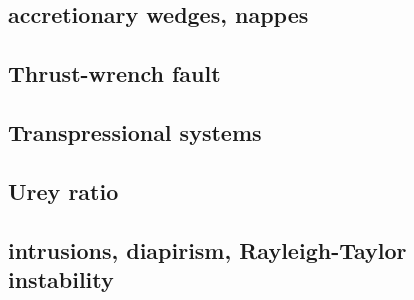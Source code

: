 \noindent
\cite{lejm08}
\cite{ligt09}\cite{gogk09}
\cite{ligt11}
\cite{gobg14}\cite{yadl14}
\cite{neum19}

\subsection*{accretionary wedges, nappes} 

\noindent
\cite{stoc83}\cite{dasd83}
\cite{dahl84}\cite{dasd84}
\cite{dahl90}
\cite{koon94}
\cite{wiep03}
\cite{rugb14}
\cite{mauw16}
\cite{mauw17}\cite{rugb17}
\cite{elgb19}

\subsection*{Thrust-wrench fault} 

\noindent
\cite{rods15}

\subsection*{Transpressional systems} 

\noindent
\cite{tite94}
\cite{thsj97}
\cite{konc03}\cite{upke03}
\cite{legs11}
\cite{naam17}\cite{rugb17}
\cite{naam18}

\subsection{Urey ratio}

\cite{kore08} 

\subsection*{intrusions, diapirism, Rayleigh-Taylor instability}

